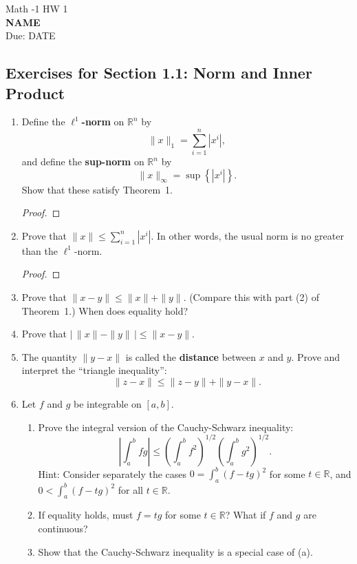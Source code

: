 \documentclass[]{book}
\theoremstyle{definition}
\newcommand{\bb}[1]{\mathbb{#1}}
\newcommand{\R}{\bb{R}}
\newcommand{\textdf}[1]{\textbf{\textsf{#1}}\index{#1}}
\newcommand{\ds}{\displaystyle}
\begin{document}
\begin{center}
{\Large Math -1 \hspace{0.5cm} HW 1}\\
\textbf{NAME}\\ %
Due: DATE %
\end{center}

\vspace{0.2 cm}


\subsection*{Exercises for Section 1.1: Norm and Inner Product}

\begin{enumerate}
\item\label{norms}
Define the \textdf{$\ell^1$-norm} on $\R^n$ by
	$$\|x\|_1 = \sum_{i=1}^n |x^i|,$$
	and define the \textdf{sup-norm} on $\R^n$ by
	$$\|x\|_\infty = \sup\left\{|x^i|\right\}.$$
	Show that these satisfy Theorem~1.
\begin{proof}
\end{proof}

\item	Prove that $\ds \|x\|\leq \sum_{i=1}^n |x^i|$.  In other words, the usual norm is no greater than the $\ell^1$-norm.
\begin{proof}
\end{proof}

\item	Prove that $\|x-y\| \leq \|x\| + \|y\|$.  (Compare this with part (2) of
	Theorem~1.)  When does equality hold?

\item	Prove that $\ds \bigg| \, \|x\|-\|y\| \, \bigg| \leq \|x-y\|$.

\item	The quantity $\|y-x\|$ is called the \textdf{distance} between $x$ and
$y$.  Prove and interpret the ``triangle inequality'':
$$\|z-x\| \leq \|z-y\| + \|y-x\|.$$

\item\label{caushw}	Let $f$ and $g$ be integrable on $[a,b]$.
\begin{enumerate}
	\item	Prove the integral version of the Cauchy-Schwarz inequality:
	$$\left|\int_a^b fg\right| \leq \left(\int_a^b
	f^2\right)^{1/2}\left(\int_a^b g^2\right)^{1/2}.$$
	Hint:  Consider separately the cases $0 = \int_a^b(f-t g)^2$ for
	some $t\in\R$, and $0<\int_a^b(f-t g)^2$ for all
	$t\in\R$.
	\item	If equality holds, must $f=t g$ for some $t\in\R$?
	What if $f$ and $g$ are continuous?
	\item	Show that the Cauchy-Schwarz inequality is a special case of
	(a).


\end{enumerate}
\end{enumerate}
\end{document}
